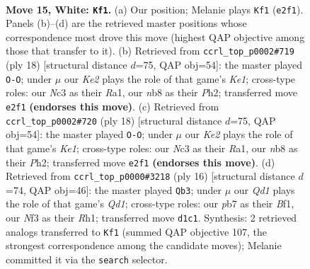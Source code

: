 \documentclass[11pt]{article}
\begin{document}
\clearpage

\begin{figure}[p]\centering
\begin{subfigure}{0.46\textwidth}\centering
\resizebox{\linewidth}{!}{%
\newchessgame
\chessboard[
  setfen={rnb1k2r/1p4b1/3pq1p1/p1p2p1p/3P4/2N1BN2/PPP1KPPP/R2Q2R1 w kq - 0 15},
  showmover=false,
  pgfstyle=straightmove, color=movearrow, markmove={e2-f1}
]}
\caption{}
\end{subfigure}\hfill
\begin{subfigure}{0.46\textwidth}\centering
\resizebox{\linewidth}{!}{%
\newchessgame
\chessboard[
  setfen={rnbqk2r/pp3pp1/4p2p/2p1P3/1bBP4/2N2N2/PP3PPP/R2QK2R w KQkq - 0 10},
  showmover=false,
  pgfstyle=straightmove, color=movearrow, markmove={e1-g1}
]}
\caption{}
\end{subfigure}
\\[4pt]
\begin{subfigure}{0.46\textwidth}\centering
\resizebox{\linewidth}{!}{%
\newchessgame
\chessboard[
  setfen={rnbqk2r/pp3pp1/4p2p/2p1P3/1bBP4/2N2N2/PP3PPP/R2QK2R w KQkq - 0 10},
  showmover=false,
  pgfstyle=straightmove, color=movearrow, markmove={e1-g1}
]}
\caption{}
\end{subfigure}\hfill
\begin{subfigure}{0.46\textwidth}\centering
\resizebox{\linewidth}{!}{%
\newchessgame
\chessboard[
  setfen={rnb1k2r/pp3pp1/5q1p/2pp4/1b1P4/2N1PN2/PP3PPP/R2QKB1R w KQkq - 0 9},
  showmover=false,
  pgfstyle=straightmove, color=movearrow, markmove={d1-b3}
]}
\caption{}
\end{subfigure}
\caption{\textbf{Move 15, White: \texttt{Kf1}.} (a) Our position; Melanie plays \texttt{Kf1} (\texttt{e2f1}). Panels (b)--(d) are the retrieved master positions whose correspondence most drove this move (highest QAP objective among those that transfer to it). (b) Retrieved from \texttt{ccrl\_top\_p0002\#719} (ply 18) [structural distance $d$=75, QAP obj=54]: the master played \texttt{O-O}; under $\mu$ our \emph{Ke2} plays the role of that game's \emph{Ke1}; cross-type roles: our \emph{N}c3 as their \emph{R}a1, our \emph{n}b8 as their \emph{P}h2; transferred move \texttt{e2f1} \textbf{(endorses this move)}. (c) Retrieved from \texttt{ccrl\_top\_p0002\#720} (ply 18) [structural distance $d$=75, QAP obj=54]: the master played \texttt{O-O}; under $\mu$ our \emph{Ke2} plays the role of that game's \emph{Ke1}; cross-type roles: our \emph{N}c3 as their \emph{R}a1, our \emph{n}b8 as their \emph{P}h2; transferred move \texttt{e2f1} \textbf{(endorses this move)}. (d) Retrieved from \texttt{ccrl\_top\_p0000\#3218} (ply 16) [structural distance $d$=74, QAP obj=46]: the master played \texttt{Qb3}; under $\mu$ our \emph{Qd1} plays the role of that game's \emph{Qd1}; cross-type roles: our \emph{p}b7 as their \emph{B}f1, our \emph{N}f3 as their \emph{R}h1; transferred move \texttt{d1c1}. Synthesis: 2 retrieved analogs transferred to \texttt{Kf1} (summed QAP objective 107, the strongest correspondence among the candidate moves); Melanie committed it via the \texttt{search} selector.}
\label{fig:thought-m28}
\end{figure}
\end{document}
